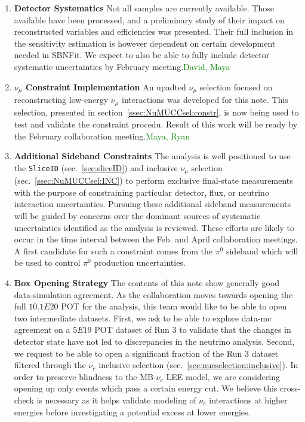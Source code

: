 \documentclass[a4paper]{article}
\begin{document}
\begin{enumerate}
    \item \textbf{Detector Systematics} Not all samples are currently available. Those available have been processed, and a preliminary study of their impact on reconstructed variables and efficiencies was presented. Their full inclusion in the sensitivity estimation is however dependent on certain development needed in SBNFit. We expect to also be able to fully include detector systematic uncertainties by February meeting.\textcolor{green}{David, Maya}
    \item \textbf{$\nu_{\mu}$ Constraint Implementation} An upadted $\nu_{\mu}$ selection focused on reconstructing low-energy $\nu_{\mu}$ interactions was developed for this note. This selection, presented in section~\ref{ssec:NuMUCCsel:constr}, is now being used to test and validate the constraint procedu. Result of this work will be ready by the February collaboration meeting.\textcolor{green}{Maya, Ryan}
    \item \textbf{Additional Sideband Constraints} The analysis is well positioned to use the \texttt{SliceID} (sec.~\ref{sec:sliceID}) and inclusive $\nu_{\mu}$ selection (sec.~\ref{ssec:NuMUCCsel:INC}) to perform exclusive final-state measurements with the purpose of constraining particular detector, flux, or neutrino interaction uncertainties. Pursuing these additional sideband measurements will be guided by concerns over the dominant sources of systematic uncertainties identified as the analysis is reviewed. These efforts are likely to occur in the time interval between the Feb. and April collaboration meetings. A first candidate for such a constraint comes from the $\pi^0$ sideband which will be used to control $\pi^0$ production uncertainties.
    \item \textbf{Box Opening Strategy} The contents of this note show generally good data-simulation agreement. As the collaboration moves towards opening the full $10.1E20$ POT for the analysis, this team would like to be able to open two intermediate datasets. First, we ask to be able to explore data-mc agreement on a $5E19$ POT dataset of Run 3 to validate that the changes in detector state have not led to discrepancies in the neutrino analysis. Second, we request to be able to open a significant fraction of the Run 3 dataset filtered through the $\nu_e$ inclusive selection (sec.~\ref{sec:nueselection:inclusive}). In order to preserve blindness to the MB-$\nu_e$ LEE model, we are considering opening up only events which pass a certain energy cut. We believe this cross-check is necessary as it helps validate modeling of $\nu_e$ interactions at higher energies before investigating a potential excess at lower energies.

\end{enumerate}{}
\end{document}
